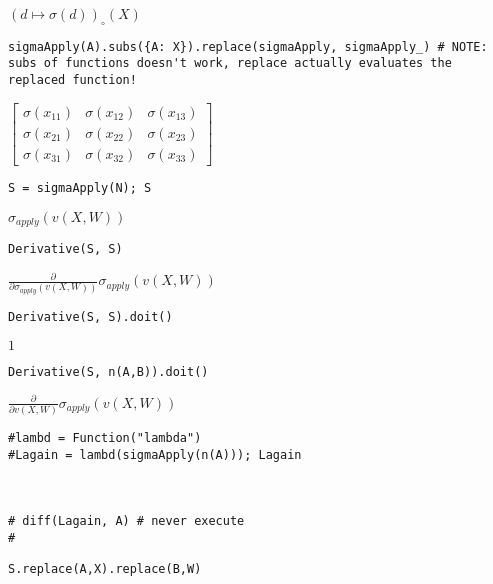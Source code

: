 \documentclass[
]{article}
\begin{document}
\(\displaystyle {\left( d \mapsto \sigma{\left(d \right)} \right)}_{\circ}\left({X}\right)\)

\begin{verbatim}
sigmaApply(A).subs({A: X}).replace(sigmaApply, sigmaApply_) # NOTE: subs of functions doesn't work, replace actually evaluates the replaced function!
\end{verbatim}

\(\displaystyle \left[\begin{matrix}\sigma{\left(x_{11} \right)} & \sigma{\left(x_{12} \right)} & \sigma{\left(x_{13} \right)}\\\sigma{\left(x_{21} \right)} & \sigma{\left(x_{22} \right)} & \sigma{\left(x_{23} \right)}\\\sigma{\left(x_{31} \right)} & \sigma{\left(x_{32} \right)} & \sigma{\left(x_{33} \right)}\end{matrix}\right]\)

\begin{verbatim}
S = sigmaApply(N); S
\end{verbatim}

\(\displaystyle \sigma_{apply}{\left(v{\left(X,W \right)} \right)}\)

\begin{verbatim}
Derivative(S, S)
\end{verbatim}

\(\displaystyle \frac{\partial}{\partial \sigma_{apply}{\left(v{\left(X,W \right)} \right)}} \sigma_{apply}{\left(v{\left(X,W \right)} \right)}\)

\begin{verbatim}
Derivative(S, S).doit()
\end{verbatim}

\(\displaystyle 1\)

\begin{verbatim}
Derivative(S, n(A,B)).doit()
\end{verbatim}

\(\displaystyle \frac{\partial}{\partial v{\left(X,W \right)}} \sigma_{apply}{\left(v{\left(X,W \right)} \right)}\)

\begin{verbatim}
#lambd = Function("lambda")
#Lagain = lambd(sigmaApply(n(A))); Lagain



# diff(Lagain, A) # never execute
#
\end{verbatim}

\begin{verbatim}
S.replace(A,X).replace(B,W)
\end{verbatim}
\end{document}
